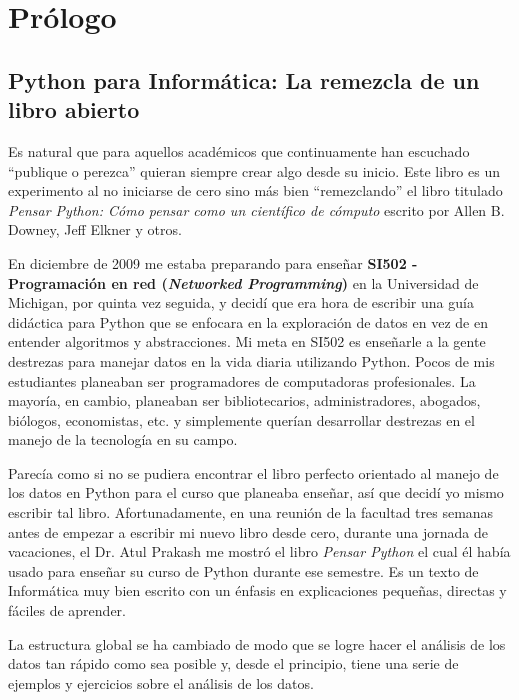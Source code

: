 
\chapter{Pr\'ologo}

\section*{Python para Inform\'atica: La remezcla de un libro abierto}

Es natural que para aquellos acad\'emicos que continuamente han escuchado ``publique o perezca'' quieran siempre crear algo desde su inicio. Este libro es  un 
experimento al no iniciarse de cero sino m\'as bien ``remezclando''
el libro titulado
\emph{Pensar Python: C\'omo pensar como un cient\'ifico de c\'omputo}
escrito por Allen B. Downey, Jeff Elkner y otros.

En diciembre de 2009 me estaba preparando para ense\~nar
{\bf SI502 - Programaci\'on en red (\textit{Networked Programming})} en la Universidad de Michigan,
por quinta vez seguida, y decid\'i que era hora de escribir una gu\'ia did\'actica para Python que se enfocara en la exploraci\'on de datos en vez de en entender algoritmos y abstracciones.
Mi meta en SI502 es ense\~narle a la gente destrezas para manejar datos en la vida diaria utilizando Python. Pocos de mis estudiantes planeaban ser programadores de computadoras profesionales. La mayor\'ia, en cambio, planeaban ser bibliotecarios, administradores, abogados, bi\'ologos, economistas, etc. y simplemente quer\'ian desarrollar destrezas en el manejo de la tecnolog\'ia en su campo.

Parec\'ia como si no se pudiera encontrar el libro perfecto orientado al manejo de los datos en Python para el curso que planeaba ense\~nar, as\'i que decid\'i yo mismo escribir tal libro. 
Afortunadamente, en una reuni\'on de la facultad tres semanas antes de empezar a escribir mi nuevo libro desde cero, durante una jornada de vacaciones, el Dr. Atul Prakash me mostr\'o el libro \emph{Pensar Python} el cual \'el hab\'ia usado para ense\~nar su curso de Python durante ese semestre.  
Es un texto de Inform\'atica muy bien escrito con un \'enfasis en explicaciones peque\~nas, directas y f\'aciles de aprender.  

La estructura global se ha cambiado de modo que se logre hacer el an\'alisis de los datos tan r\'apido como sea posible y, desde el principio, tiene una serie de ejemplos y ejercicios sobre el an\'alisis de los datos.

